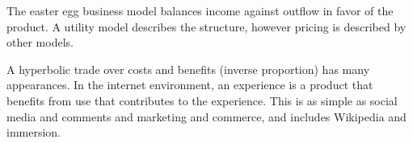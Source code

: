 

The easter egg business model balances income against outflow in favor
of the product.  A utility model describes the structure, however
pricing is described by other models.

A hyperbolic trade over costs and benefits (inverse proportion) has
many appearances.  In the internet environment, an experience is a
product that benefits from use that contributes to the experience.
This is as simple as social media and comments and marketing and
commerce, and includes Wikipedia and immersion.

\bye
